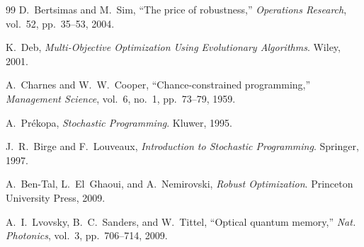 \documentclass[twocolumn]{article}
\begin{document}
\begin{thebibliography}{99}
D.~Bertsimas and M.~Sim, ``The price of robustness,''
\emph{Operations Research}, vol.~52, pp.~35--53, 2004.

K.~Deb, \emph{Multi-Objective Optimization Using Evolutionary
Algorithms}.  Wiley, 2001.

A.~Charnes and W.~W.~Cooper,
``Chance-constrained programming,''
\emph{Management Science}, vol.~6, no.~1, pp.~73--79, 1959.

A.~Pr\'ekopa, \emph{Stochastic Programming}.  Kluwer, 1995.

J.~R.~Birge and F.~Louveaux, \emph{Introduction to Stochastic
Programming}.  Springer, 1997.

A.~Ben-Tal, L.~El~Ghaoui, and A.~Nemirovski, \emph{Robust
Optimization}.  Princeton University Press, 2009.

A.~I.~Lvovsky, B.~C.~Sanders, and W.~Tittel,
``Optical quantum memory,''
\emph{Nat. Photonics}, vol.~3, pp.~706--714, 2009.

\end{thebibliography}
\end{document}
